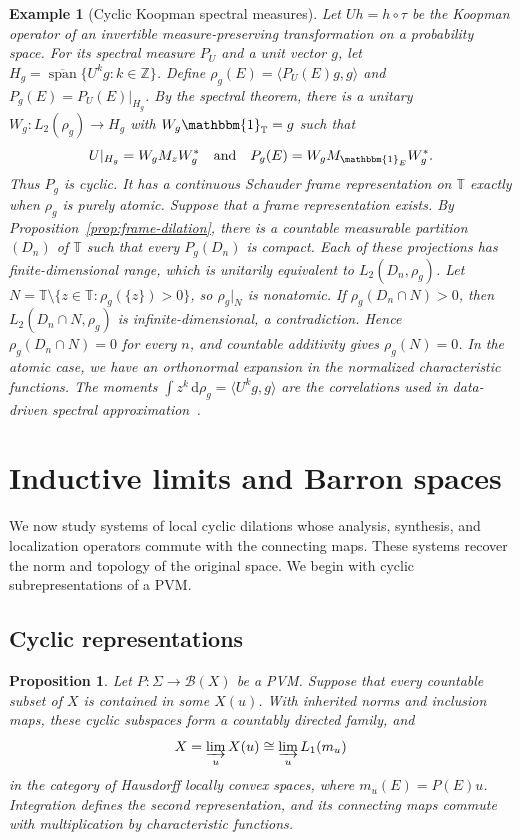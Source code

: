 \documentclass[11pt,leqno]{amsart}
\theoremstyle{compact}
\numberwithin{equation}{section}
\newtheorem{proposition}[theorem]{Proposition}
\theoremstyle{compactremark}
\newtheorem{example}[theorem]{Example}
\theoremstyle{compact}
\def\cspan{\overline{\operatorname{span}}}
\newcommand{\1}{\mathbbm{1}}
\newcommand{\rmd}{\mathrm{d}}
\newcommand{\cB}{\mathcal{B}}
\newcommand{\inp}[2]{\langle #1,#2\rangle}
\begin{document}
\begin{example}[Cyclic Koopman spectral measures]\label{ex:koopman-cyclic}
Let $Uh=h\circ\tau$ be the Koopman operator of an invertible measure-preserving transformation on a probability space. For its spectral measure $P_U$ and a unit vector $g$, let $H_g=\cspan\{U^kg:k\in\mathbb Z\}$. Define $\rho_g(E)=\inp{P_U(E)g}{g}$ and $P_g(E)=P_U(E)|_{H_g}$. By the spectral theorem, there is a unitary $W_g:L_2(\rho_g)\to H_g$ with $W_g\1_{\mathbb T}=g$ such that
\[
U|_{H_g}=W_gM_zW_g^*\quad\text{and}\quad P_g(E)=W_gM_{\1_E}W_g^*.
\]
Thus $P_g$ is cyclic. It has a continuous Schauder frame representation on $\mathbb T$ exactly when $\rho_g$ is purely atomic. Suppose that a frame representation exists. By Proposition~\ref{prop:frame-dilation}, there is a countable measurable partition $(D_n)$ of $\mathbb T$ such that every $P_g(D_n)$ is compact. Each of these projections has finite-dimensional range, which is unitarily equivalent to $L_2(D_n,\rho_g)$. Let $N=\mathbb T\setminus\{z\in\mathbb T:\rho_g(\{z\})>0\}$, so $\rho_g|_N$ is nonatomic. If $\rho_g(D_n\cap N)>0$, then $L_2(D_n\cap N,\rho_g)$ is infinite-dimensional, a contradiction. Hence $\rho_g(D_n\cap N)=0$ for every $n$, and countable additivity gives $\rho_g(N)=0$. In the atomic case, we have an orthonormal expansion in the normalized characteristic functions. The moments $\int z^k\,\rmd\rho_g=\inp{U^kg}{g}$ are the correlations used in data-driven spectral approximation~\cite{KordaPutinarMezic2020}.
\end{example}

\section{Inductive limits and Barron spaces}\label{sec:inductive}

We now study systems of local cyclic dilations whose analysis, synthesis, and localization operators commute with the connecting maps. These systems recover the norm and topology of the original space. We begin with cyclic subrepresentations of a PVM.

\subsection[Cyclic representations]{Cyclic representations}

\begin{proposition}\label{prop:cyclic-inductive}
Let $P\colon\Sigma\to\cB(X)$ be a PVM. Suppose that every countable subset of $X$ is contained in some $X(u)$. With inherited norms and inclusion maps, these cyclic subspaces form a countably directed family, and
\[
X=\varinjlim_u X(u)\cong\varinjlim_u L_1(m_u)
\]
in the category of Hausdorff locally convex spaces, where $m_u(E)=P(E)u$. Integration defines the second representation, and its connecting maps commute with multiplication by characteristic functions.
\end{proposition}
\end{document}
